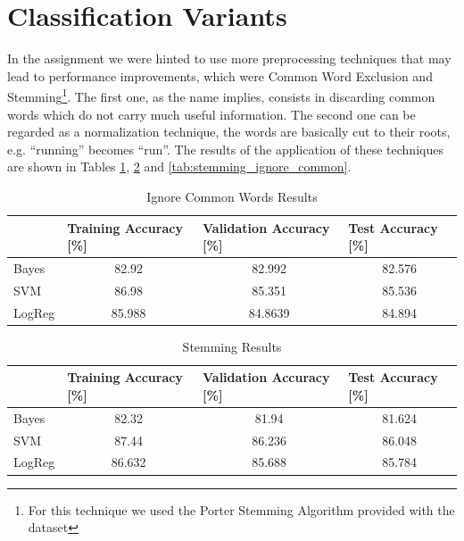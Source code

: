 \documentclass[10pt,a4paper]{report}
\begin{document}
\section{Classification Variants}
In the assignment we were hinted to use more preprocessing techniques that may lead to performance improvements, which were Common Word Exclusion and Stemming\footnote{For this technique we used the Porter Stemming Algorithm provided with the dataset}. The first one, as the name implies, consists in discarding common words which do not carry much useful information. The second one can be regarded as a normalization technique, the words are basically cut to their roots, e.g. \enquote{running} becomes \enquote{run}. The results of the application of these techniques are shown in Tables \ref{tab:ignore_common}, \ref{tab:stemming} and \ref{tab:stemming_ignore_common}.
\begin{table}[!ht]
\centering
\begin{tabular}{|l|c|c|c|}
\hline
 & \multicolumn{1}{l|}{Training Accuracy {[}\%{]}} & \multicolumn{1}{l|}{Validation Accuracy {[}\%{]}} & \multicolumn{1}{l|}{Test Accuracy {[}\%{]}} \\ \hline
Bayes  & 82.92  & 82.992  & 82.576 \\ \hline
SVM    & 86.98  & 85.351  & 85.536 \\ \hline
LogReg & 85.988 & 84.8639 & 84.894 \\ \hline
\end{tabular}
\caption{Ignore Common Words Results}
\label{tab:ignore_common}
\end{table} 

\begin{table}[!ht]
\centering
\begin{tabular}{|l|c|c|c|}
\hline
 & \multicolumn{1}{l|}{Training Accuracy {[}\%{]}} & \multicolumn{1}{l|}{Validation Accuracy {[}\%{]}} & \multicolumn{1}{l|}{Test Accuracy {[}\%{]}} \\ \hline
Bayes  & 82.32  & 81.94  & 81.624 \\ \hline
SVM    & 87.44  & 86.236 & 86.048 \\ \hline
LogReg & 86.632 & 85.688 & 85.784 \\ \hline
\end{tabular}
\caption{Stemming Results}
\label{tab:stemming}
\end{table} 
\end{document}
